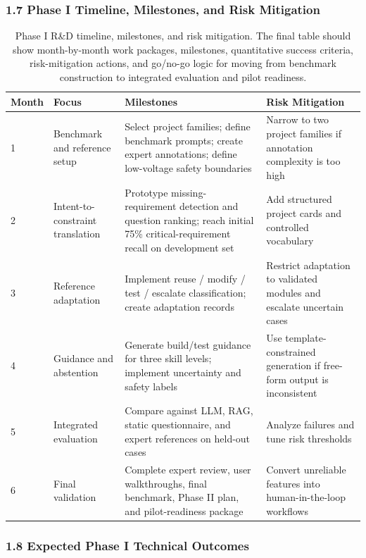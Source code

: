 \subsubsection*{1.7 Phase I Timeline, Milestones, and Risk Mitigation}

\begin{table}[H]
\centering
\caption{Phase I R\&D timeline, milestones, and risk mitigation. The final table should show month-by-month work packages, milestones, quantitative success criteria, risk-mitigation actions, and go/no-go logic for moving from benchmark construction to integrated evaluation and pilot readiness.}
\label{tab:phase1_timeline}
\renewcommand{\arraystretch}{1.15}
\small
\begin{tabular}{p{} p{} p{} p{}}
\hline
\textbf{Month} & \textbf{Focus} & \textbf{Milestones} & \textbf{Risk Mitigation} \\
\hline
1 & Benchmark and reference setup & Select project families; define benchmark prompts; create expert annotations; define low-voltage safety boundaries & Narrow to two project families if annotation complexity is too high \\
2 & Intent-to-constraint translation & Prototype missing-requirement detection and question ranking; reach initial 75\% critical-requirement recall on development set & Add structured project cards and controlled vocabulary \\
3 & Reference adaptation & Implement reuse / modify / test / escalate classification; create adaptation records & Restrict adaptation to validated modules and escalate uncertain cases \\
4 & Guidance and abstention & Generate build/test guidance for three skill levels; implement uncertainty and safety labels & Use template-constrained generation if free-form output is inconsistent \\
5 & Integrated evaluation & Compare against LLM, RAG, static questionnaire, and expert references on held-out cases & Analyze failures and tune risk thresholds \\
6 & Final validation & Complete expert review, user walkthroughs, final benchmark, Phase II plan, and pilot-readiness package & Convert unreliable features into human-in-the-loop workflows \\
\hline
\end{tabular}
\end{table}

\subsubsection*{1.8 Expected Phase I Technical Outcomes}

